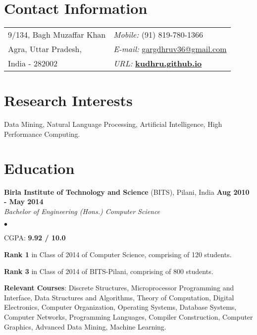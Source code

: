 \documentclass[margin,line]{res}
\newenvironment{list2}{
  \begin{list}{$\bullet$}{%
      \setlength{\itemsep}{0in}
      \setlength{\parsep}{0in} \setlength{\parskip}{0in}
      \setlength{\topsep}{0in} \setlength{\partopsep}{0in} 
      \setlength{\leftmargin}{0.2in}}}{\end{list}}
\begin{document}

\begin{resume}
\section{\sc Contact Information}
\vspace{.05in}
\begin{tabular}{@{}p{3in}p{4in}}
9/134, Bagh Muzaffar Khan         & {\it Mobile:}  (91) 819-780-1366 \\            
 Agra, Uttar Pradesh, & {\it E-mail:}  \href{mailto:gargdhruv36@gmail.com }{gargdhruv36@gmail.com }\\
 India - 282002 &{\it URL:}  \href{http://kudhru.github.io}{\bf kudhru.github.io}
\end{tabular}


\section{\sc Research Interests}
Data Mining, Natural Language Processing, Artificial Intelligence, High Performance Computing.

\section{\sc Education}
{\bf Birla Institute of Technology and Science} (BITS), Pilani, India \hfill {\bf {Aug 2010 - May 2014}}\\
{\em Bachelor of Engineering (Hons.) Computer Science }
\vspace*{.3cm}
\begin{list2}
\item CGPA:  {\bf {9.92 / 10.0}}
\item {\bf Rank 1} in Class of 2014 of Computer Science, comprising of 120 students. 
\item {\bf Rank 3} in Class of 2014 of BITS-Pilani, comprising of 800 students.
\item {\bf Relevant Courses}: Discrete Structures, Microprocessor Programming
and Interface, Data Structures and Algorithms, Theory of Computation, Digital Electronics,
Computer Organization, Operating Systems, Database Systems, Computer Networks,
Programming Languages, Compiler Construction, Computer Graphics, Advanced Data Mining, Machine Learning.


\end{list2}
\end{resume}
\end{document}
